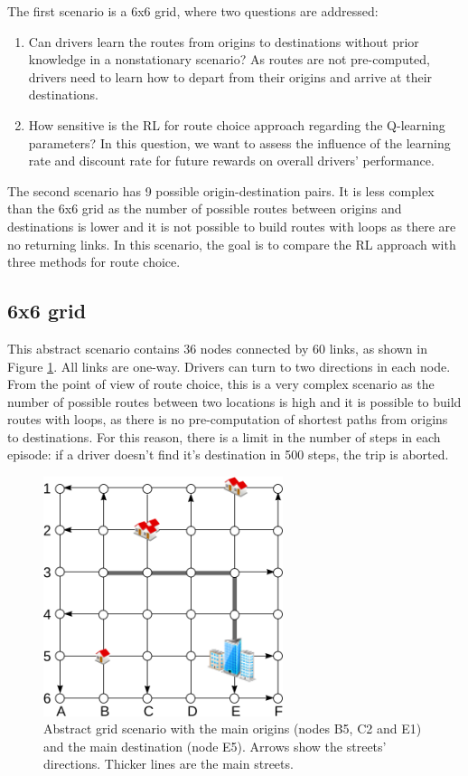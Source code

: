 \documentclass{RITA}
\begin{document}
The first scenario is a 6x6 grid, where two questions are addressed:

\begin{enumerate}
  \item Can drivers learn the routes from origins to destinations without prior knowledge in a nonstationary scenario? As routes are not pre-computed, drivers need to learn how to depart from their origins and arrive at their destinations.
  \item How sensitive is the RL for route choice approach regarding the Q-learning parameters? In this question, we want to assess the influence of the learning rate and discount rate for future rewards on overall drivers' performance.
\end{enumerate}

The second scenario has 9 possible origin-destination pairs. It is less complex than the 6x6 grid as the number of possible routes between origins and destinations is lower and it is not possible to build routes with loops as there are no returning links. In this scenario, the goal is to compare the RL approach with three methods for route choice.

\subsection{6x6 grid}

This abstract scenario contains 36 nodes connected by 60 links, as shown in Figure \ref{fig:6x6grid}. All links are one-way. Drivers can turn to two directions in each node. From the point of view of route choice, this is a very complex scenario as the number of possible routes between two locations is high and it is possible to build routes with loops, as there is no pre-computation of shortest paths from origins to destinations. For this reason, there is a limit in the number of steps in each episode: if a driver doesn't find it's destination in 500 steps, the trip is aborted.

\begin{figure}[ht]
    \centerline{\includegraphics[width=7cm]{img/6x6grid.png}}
    \caption{Abstract grid scenario with the main origins (nodes B5, C2 and E1) and the main destination (node E5). Arrows show the streets' directions. Thicker lines are the main streets.}
    \label{fig:6x6grid}
\end{figure} 
\end{document}
